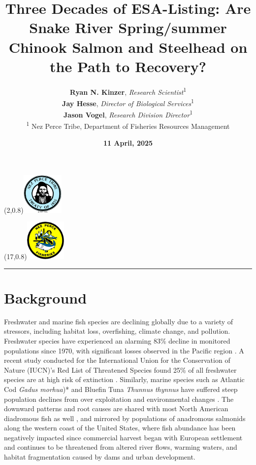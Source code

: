 \documentclass[10pt,a4paper]{article}
\title{Three Decades of ESA-Listing: Are Snake River Spring/summer Chinook Salmon and Steelhead on the Path to Recovery?}
\author{%
\textbf{Ryan N. Kinzer}, \emph{Research Scientist}\textsuperscript{1}\\[0.5em]
\textbf{Jay Hesse}, \emph{Director of Biological Services}\textsuperscript{1}\\[0.5em]
\textbf{Jason Vogel}, \emph{Research Division Director}\textsuperscript{1}\\[0.5em]
\textsuperscript{1} Nez Perce Tribe, Department of Fisheries Resources Management\\
}
\date{\textbf{11 April, 2025}}
\begin{document}

\maketitle

  \vspace*{-1.5cm}
  \begin{textblock}{4}(2,0.8)\includegraphics[height=2.0cm]{../templates/NPT.png}\end{textblock}
  \begin{textblock}{4}(17,0.8)\includegraphics[height=2.0cm]{../templates/DFRM.png}\end{textblock}


  \vspace{1em}
  \rule{\linewidth}{0.2pt}



\section{Background}\label{background}

Freshwater and marine fish species are declining globally due to a variety of stressors, including habitat loss, overfishing, climate change, and pollution. Freshwater species have experienced an alarming 83\% decline in monitored populations since 1970, with significant losses observed in the Pacific region \autocite{wwf_living_2022}. A recent study conducted for the International Union for the Conservation of Nature (IUCN)'s Red List of Threatened Species found 25\% of all freshwater species are at high risk of extinction \autocite{sayer_one-quarter_2025}. Similarly, marine species such as Atlantic Cod \emph{Gadus morhua})* and Bluefin Tuna \emph{Thunnus thynnus} have suffered steep population declines from over exploitation and environmental changes \autocite{fao_state_2020}. The downward patterns and root causes are shared with most North American diadromous fish as well \autocite{waldman_north_2022}, and mirrored by populations of anadromous salmonids along the western coast of the United States, where fish abundance has been negatively impacted since commercial harvest began with European settlement \autocite{chapman_salmon_1986} and continues to be threatened from altered river flows, warming waters, and habitat fragmentation caused by dams and urban development.
\end{document}
